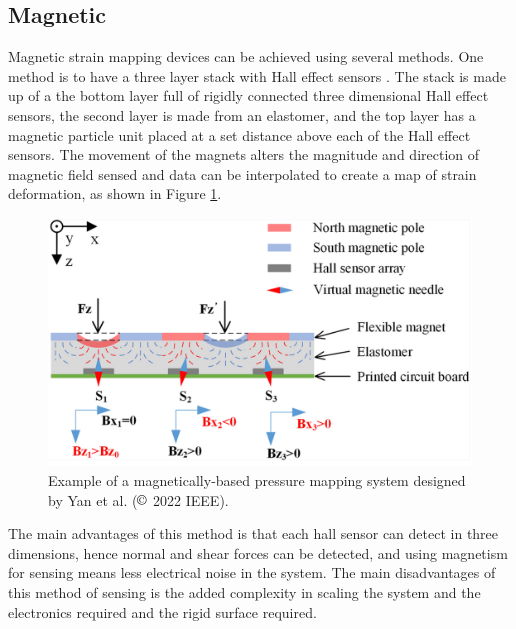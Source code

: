 \subsection{Magnetic}
Magnetic strain mapping devices can be achieved using several methods. One method is to have a three layer stack with Hall effect sensors \cite{Yan2021,Yan2022}. The stack is made up of a the bottom layer full of rigidly connected three dimensional Hall effect sensors, the second layer is made from an elastomer, and the top layer has a magnetic particle unit placed at a set distance above each of the Hall effect sensors. The movement of the magnets alters the magnitude and direction of magnetic field sensed and data can be interpolated to create a map of strain deformation, as shown in Figure \ref{fig:mag_pressure_map_sensor}. 
\begin{figure}[H]
	\centering
	\includegraphics[width=0.6\linewidth]{Figures/mag_pressure_mapping.png}
	\caption{Example of a magnetically-based pressure mapping system designed by Yan et al. \cite{Yan2022} ($\copyright$ 2022 IEEE).}
	\label{fig:mag_pressure_map_sensor}
\end{figure}
The main advantages of this method is that each hall sensor can detect in three dimensions, hence normal and shear forces can be detected, and using magnetism for sensing means less electrical noise in the system. The main disadvantages of this method of sensing is the added complexity in scaling the system and the electronics required and the rigid surface required.  


